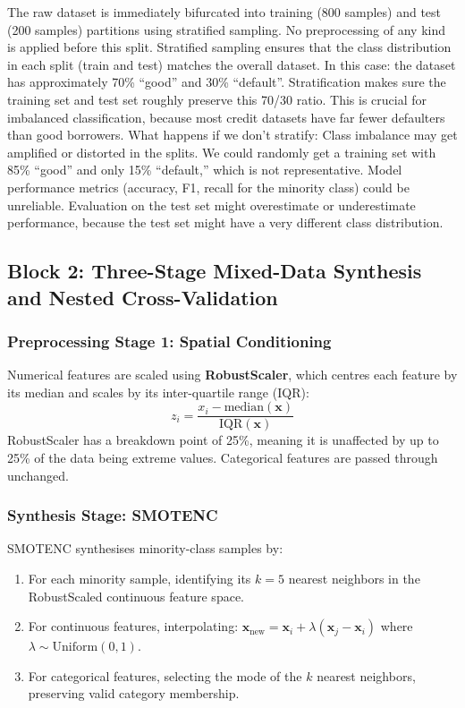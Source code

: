 \documentclass[12pt,a4paper]{article}
\begin{document}
The raw dataset is immediately bifurcated into training (800 samples) and test (200 samples) partitions using stratified sampling. No preprocessing of any kind is applied before this split.
Stratified sampling ensures that the class distribution in each split (train and test) matches the overall dataset. In this case:
the dataset has approximately 70\% “good” and 30\% “default”.
\newline Stratification makes sure the training set and test set roughly preserve this 70/30 ratio.
This is crucial for imbalanced classification, because most credit datasets have far fewer defaulters than good borrowers.
\newline What happens if we don’t stratify:
Class imbalance may get amplified or distorted in the splits.
We could randomly get a training set with 85\% “good” and only 15\% “default,” which is not representative.
Model performance metrics (accuracy, F1, recall for the minority class) could be unreliable.
Evaluation on the test set might overestimate or underestimate performance, because the test set might have a very different class distribution.
\subsection{Block 2: Three-Stage Mixed-Data Synthesis and Nested Cross-Validation}

\subsubsection{Preprocessing Stage 1: Spatial Conditioning}

Numerical features are scaled using \textbf{RobustScaler}, which centres each feature by its median and scales by its inter-quartile range (IQR):
\[
z_i = \frac{x_i - \text{median}(\mathbf{x})}{\text{IQR}(\mathbf{x})}
\]
RobustScaler has a breakdown point of 25\%, meaning it is unaffected by up to 25\% of the data being extreme values. Categorical features are passed through unchanged.

\subsubsection{Synthesis Stage: SMOTENC}

SMOTENC synthesises minority-class samples by:
\begin{enumerate}
    \item For each minority sample, identifying its $k=5$ nearest neighbors in the RobustScaled continuous feature space.
    \item For continuous features, interpolating: $\mathbf{x}_\text{new} = \mathbf{x}_i + \lambda (\mathbf{x}_j - \mathbf{x}_i)$ where $\lambda \sim \text{Uniform}(0,1)$.
    \item For categorical features, selecting the mode of the $k$ nearest neighbors, preserving valid category membership.
\end{enumerate}
\end{document}
